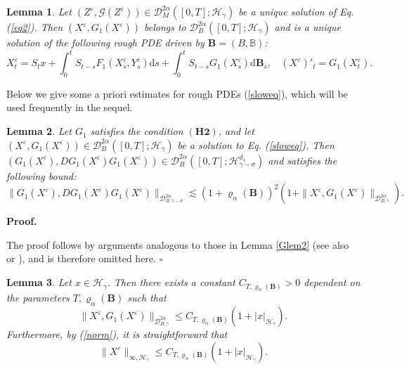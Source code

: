 \documentclass[10pt,a4paper]{article}
\newtheorem{lemma}{Lemma}[section]
\numberwithin{equation}{section}
\newenvironment{proof}[1][\normalfont\bfseries Proof]{%
	\noindent #1.\hspace{0.5em}%
	\ignorespaces%
}{%
	\hfill $\square$%
	\par%
}
\begin{document}
\begin{lemma}
Let $(Z^\varepsilon, \mathcal G(Z^\varepsilon)) \in \mathcal{D}_{M}^{2\alpha}([0,T];\mathscr{H}_\gamma)$ be a unique solution of Eq. (\ref{eq2}).
Then $(X^\varepsilon, G_1(X^\varepsilon))$ belongs to $\mathcal D_{B}^{2\alpha}([0,T];\mathcal{H}_\gamma)$ and is a unique solution of the following rough PDE driven by $\mathbf B=(B,\mathbb B)$:
\begin{equation}\label{sloweq}
X_t^\varepsilon=S_t x+\int_0^t S_{t-s} F_1 (X_s^\varepsilon,Y_s^\varepsilon) \mathrm{d} s+ \int_0^t S_{t-s} G_1 (X_s^\varepsilon) \mathrm{d} \mathbf{B}_s, ~~~~(X^\varepsilon)'_t=G_1 (X_t^\varepsilon).
\end{equation}
\end{lemma}









Below we give some a priori estimates for rough PDEs (\ref{sloweq}), which will be used frequently in the sequel.



\begin{lemma}\label{funCRP}
	Let $G_1$ satisfies the condition $(\mathbf{H2})$, and let $(X^\varepsilon, G_1(X^\varepsilon)) \in \mathcal D_{B}^{2\alpha}([0,T];\mathcal{H}_\gamma)$ be a solution to Eq. (\ref{sloweq}). 	
	Then $(G_1(X^\varepsilon),DG_1(X^\varepsilon)G_1(X^\varepsilon))\in \mathcal{D}_{ B}^{2\alpha}([0,T];\mathcal{H}_{\gamma-\sigma}^{d_1})$ and satisfies the following bound:
	$$\|G_1(X^\varepsilon),DG_1(X^\varepsilon)G_1(X^\varepsilon)\|_{\mathcal{D}_{B,\gamma-\sigma}^{2\alpha} }
	\lesssim (1+\varrho_{\alpha}(\mathbf{B}))^2 \left(1+\|X^\varepsilon,G_1(X^\varepsilon)\|_{\mathcal{D}_{B,\gamma}^{2\alpha}} \right).$$
\end{lemma}
\begin{proof}
	The proof follows by arguments analogous to those in Lemma \ref{Glem2} (see also \cite[Lemma 3.5]{HN22} or \cite[Lemma 3.2]{YLZ23}), and is therefore omitted here.
\end{proof}


	\begin{lemma}\label{slowest}	
		Let $x \in \mathcal H_\gamma$. Then there exists a constant $C_{T,\varrho_{\alpha}(\mathbf{B})}>0$ dependent on the parameters $T,\varrho_{\alpha}(\mathbf{B})$ such that	
		\begin{equation}\label{X1}
			\|X^\varepsilon,G_1(X^\varepsilon)\|_{\mathcal{D}_{B,\gamma}^{2\alpha}} \leq C_{T,\varrho_{\alpha}(\mathbf{B})} (1+|x|_{\mathcal H_\gamma}).
		\end{equation}
		Furthermore, by (\ref{norm}), it is straightforward that
		\begin{equation}\label{X2}	
		\|X^\varepsilon\|_{\infty, \mathcal H_\gamma} \leq C_{T,\varrho_{\alpha}(\mathbf{B})} (1+|x|_{\mathcal H_\gamma}).	
		\end{equation}	
	\end{lemma}
	
\end{document}
